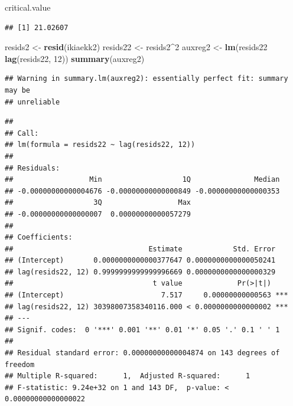 \documentclass[]{article}
\newenvironment{Shaded}{\begin{snugshade}}{\end{snugshade}}
\newcommand{\KeywordTok}[1]{\textcolor[rgb]{0.13,0.29,0.53}{\textbf{#1}}}
\newcommand{\DecValTok}[1]{\textcolor[rgb]{0.00,0.00,0.81}{#1}}
\newcommand{\StringTok}[1]{\textcolor[rgb]{0.31,0.60,0.02}{#1}}
\newcommand{\OperatorTok}[1]{\textcolor[rgb]{0.81,0.36,0.00}{\textbf{#1}}}
\newcommand{\NormalTok}[1]{#1}
\begin{document}
\begin{Shaded}
\begin{Highlighting}[]
\NormalTok{critical.value}
\end{Highlighting}
\end{Shaded}

\begin{verbatim}
## [1] 21.02607
\end{verbatim}

\begin{Shaded}
\begin{Highlighting}[]
\NormalTok{resids2 <-}\StringTok{ }\KeywordTok{resid}\NormalTok{(ikiaekk2)}
\NormalTok{resids22 <-}\StringTok{ }\NormalTok{resids2}\OperatorTok{^}\DecValTok{2}
\NormalTok{auxreg2 <-}\StringTok{ }\KeywordTok{lm}\NormalTok{(resids22 }\OperatorTok{~}\StringTok{ }\KeywordTok{lag}\NormalTok{(resids22, }\DecValTok{12}\NormalTok{))}
\KeywordTok{summary}\NormalTok{(auxreg2)}
\end{Highlighting}
\end{Shaded}

\begin{verbatim}
## Warning in summary.lm(auxreg2): essentially perfect fit: summary may be
## unreliable
\end{verbatim}

\begin{verbatim}
## 
## Call:
## lm(formula = resids22 ~ lag(resids22, 12))
## 
## Residuals:
##                  Min                   1Q               Median 
## -0.00000000000004676 -0.00000000000000849 -0.00000000000000353 
##                   3Q                  Max 
## -0.00000000000000007  0.00000000000057279 
## 
## Coefficients:
##                                Estimate            Std. Error
## (Intercept)       0.0000000000000377647 0.0000000000000050241
## lag(resids22, 12) 0.9999999999999996669 0.0000000000000000329
##                                 t value             Pr(>|t|)    
## (Intercept)                       7.517     0.00000000000563 ***
## lag(resids22, 12) 30398007358340116.000 < 0.0000000000000002 ***
## ---
## Signif. codes:  0 '***' 0.001 '**' 0.01 '*' 0.05 '.' 0.1 ' ' 1
## 
## Residual standard error: 0.00000000000004874 on 143 degrees of freedom
## Multiple R-squared:      1,  Adjusted R-squared:      1 
## F-statistic: 9.24e+32 on 1 and 143 DF,  p-value: < 0.00000000000000022
\end{verbatim}

\begin{Shaded}
\end{Shaded}
\end{document}

